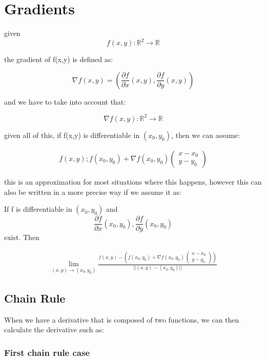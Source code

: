 \documentclass[11pt,fleqn]{book} %
\begin{document}
\section{Gradients}

given $$f(x,y) : \mathbb{R}^2 \to \mathbb{R}$$

the gradient of f(x,y) is defined as:

$$\nabla f(x,y) = (\frac{\partial f}{\partial x} (x,y), \frac{\partial f}{\partial y} (x,y))$$

and we have to take into account that:

$$\nabla f(x,y): \mathbb{R}^2 \to \mathbb{R}$$

given all of this, if f(x,y) is differentiable in $(x_0, y_0)$, then we can assume:

\begin{gather}
    f(x,y) ; f(x_0, y_0) + \nabla f(x_0, y_0) \begin{pmatrix}
        x - x_0 \\ y - y_0
    \end{pmatrix}
\end{gather}

this is an approximation for most situations where this happens, however this can also be written in a more precise
way if we assume it as:

If f is differentiable in $(x_0, y_0)$ and $$\frac{\partial f}{\partial x} (x_0, y_0) , \frac{\partial f}{\partial y} (x_0, y_0)$$
exist. Then

\begin{gather}
    \lim_{(x,y) \to (x_0, y_0)} \frac{f(x,y) - (f(x_0, y_0) + \nabla f(x_0, y_0) \ \begin{pmatrix}
        x - x_0 \\ y - y_0
    \end{pmatrix})}{||(x,y) - (x_0, y_0)||}
\end{gather}

\subsection{Chain Rule}

When we have a derivative that is composed of two functions, we can then 
calculate the derivative such as:

\subsubsection{First chain rule case}
\end{document}
